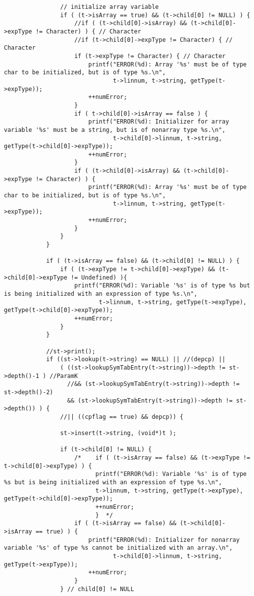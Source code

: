\documentclass[12pt]{book}
\begin{document}
\begin{lstlisting}
                // initialize array variable
                if ( (t->isArray == true) && (t->child[0] != NULL) ) {
                    //if ( (t->child[0]->isArray) && (t->child[0]->expType != Character) ) { // Character	  
                    //if (t->child[0]->expType != Character) { // Character	  
                    if (t->expType != Character) { // Character	  
                        printf("ERROR(%d): Array '%s' must be of type char to be initialized, but is of type %s.\n",
                               t->linnum, t->string, getType(t->expType));
                        ++numError;
                    }
                    if ( t->child[0]->isArray == false ) {
                        printf("ERROR(%d): Initializer for array variable '%s' must be a string, but is of nonarray type %s.\n",
                               t->child[0]->linnum, t->string, getType(t->child[0]->expType));
                        ++numError;
                    } 
                    if ( (t->child[0]->isArray) && (t->child[0]->expType != Character) ) {
                        printf("ERROR(%d): Array '%s' must be of type char to be initialized, but is of type %s.\n", 
                               t->linnum, t->string, getType(t->expType));
                        ++numError;
                    }
                }
            }

            if ( (t->isArray == false) && (t->child[0] != NULL) ) {
                if ( (t->expType != t->child[0]->expType) && (t->child[0]->expType != Undefined) ){
                    printf("ERROR(%d): Variable '%s' is of type %s but is being initialized with an expression of type %s.\n", 
                           t->linnum, t->string, getType(t->expType), getType(t->child[0]->expType));
                    ++numError;
                }
            }

            //st->print();
            if ((st->lookup(t->string) == NULL) || //(depcp) ||
                ( ((st->lookupSymTabEntry(t->string))->depth != st->depth()-1 ) //ParamK
                  //&& (st->lookupSymTabEntry(t->string))->depth != st->depth()-2) 
                  && (st->lookupSymTabEntry(t->string))->depth != st->depth()) ) {
                //|| ((cpflag == true) && depcp)) { 
	 
                st->insert(t->string, (void*)t ); 

                if (t->child[0] != NULL) {
                    /*	  if ( (t->isArray == false) && (t->expType != t->child[0]->expType) ) {
                          printf("ERROR(%d): Variable '%s' is of type %s but is being initialized with an expression of type %s.\n", 
                          t->linnum, t->string, getType(t->expType), getType(t->child[0]->expType));
                          ++numError;
                          }  */   
                    if ( (t->isArray == false) && (t->child[0]->isArray == true) ) {
                        printf("ERROR(%d): Initializer for nonarray variable '%s' of type %s cannot be initialized with an array.\n",
                               t->child[0]->linnum, t->string, getType(t->expType));
                        ++numError;
                    }
                } // child[0] != NULL


\end{lstlisting}
\end{document}
